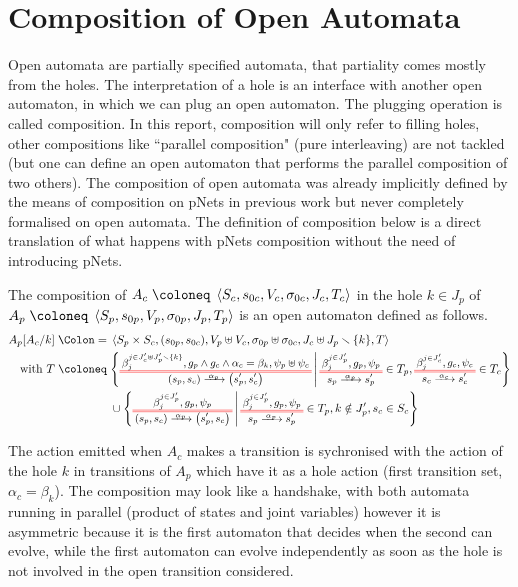 \documentclass{article}
\begin{document}
\section{Composition of Open Automata}\label{sec:comp}
Open automata are partially specified automata, that partiality comes mostly from the holes.
The interpretation of a hole is an interface with another open automaton, in which we can plug an open automaton. The plugging operation is called composition.
In this report, composition will only refer to filling holes, other compositions like ``parallel composition" (pure interleaving) are not tackled (but one can define an open automaton that performs the parallel composition of two others).
The composition of open automata was already implicitly defined by the means of composition on pNets in previous work \cite{henrio:01299562} but never completely formalised on open automata.
The definition of composition below is a direct translation of what happens with pNets composition without the need of introducing pNets.
\begin{defi}
The composition of \(A_c \defobject \OAg[c]\) in the hole \(k \in J_p\) of \(A_p \defobject \OAg[p]\) is an open automaton defined as follows.
\begin{align*}
	A_p\subst{A_c}{k} \defnotation & \OA{S_p \times S_c}{\mpar{s_{0p}, s_{0c}}}{V_p \uplus V_c}{\sigma_{0p} \uplus \sigma_{0c}}{J_c \uplus J_p \setminus \mbrc{k}}{T} \\
	\text{with } T \defobject & \mset{\OT{\mpar{s_p, s_c}}{\mpar{s'_p, s'_c}}{\alpha_p}{\beta_j^{j \in J'_c \uplus J'_p \setminus \mbrc{k}}}{g_p \wedge g_c \wedge \alpha_c = \beta_k}{\psi_p \uplus \psi_c}}{\OTx{p}{}{}{p} \in T_p, \OTx{c}{}{}{c} \in T_c} \\
	& \cup \mset{\OT{\mpar{s_p, s_c}}{\mpar{s'_p, s_c}}{\alpha_p}{\beta_j^{j \in J'_p}}{g_p}{\psi_p}}{\OTx{p}{}{}{p} \in T_p, k \notin J'_p, s_c \in S_c}
\end{align*}
\end{defi}
The action emitted when \(A_c\) makes a transition is sychronised with the action of the hole \(k\) in transitions of \(A_p\) which have it as a hole action (first transition set, \(\alpha_c = \beta_k\)).
The composition may look like a handshake, with both automata running in parallel (product of states and joint variables) however it is asymmetric because it is the first automaton that decides when the second can evolve, while the first automaton can evolve independently as soon as the hole is not involved in the open transition considered.
\end{document}
